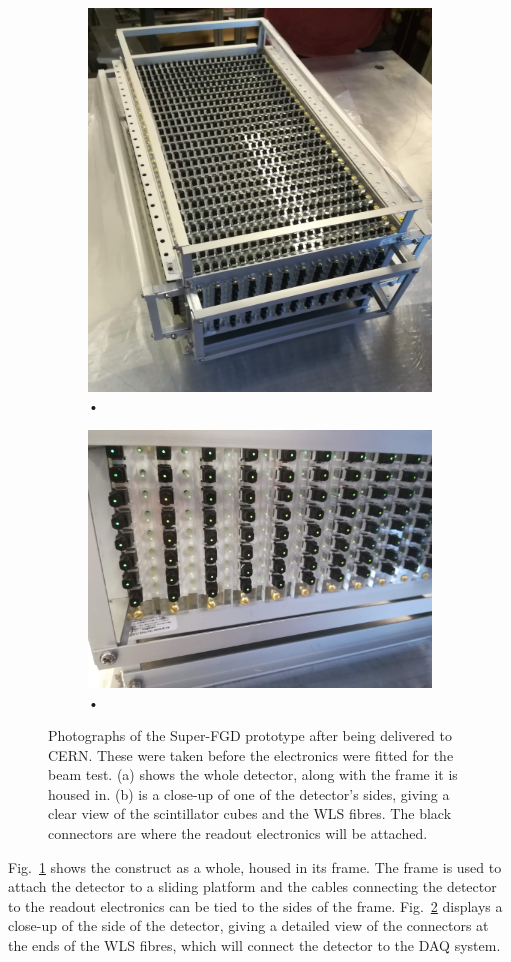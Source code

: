 \documentclass[aps,pra,12pt,notitlepage,tightenlines]{revtex4-1}
\begin{document}
 \begin{figure}
  \centering
  \begin{subfigure}{.5\textwidth}
   \centering
   \includegraphics[width=.7\linewidth]{proto}
   \caption{•}
   \label{fig:protoa}
  \end{subfigure}%
  \begin{subfigure}{.5\textwidth}
   \centering
   \includegraphics[width=.8\linewidth]{side}
   \caption{•}
   \label{fig:protob}
  \end{subfigure}
  \caption{Photographs of the Super-FGD prototype after being delivered to CERN. These were taken before the electronics were fitted for the beam test. (a) shows the whole detector, along with the frame it is housed in. (b) is a close-up of one of the detector's sides, giving a clear view of the scintillator cubes and the WLS fibres. The black connectors are where the readout electronics will be attached.}
  \label{fig:proto}
 \end{figure}
Fig.~\ref{fig:protoa} shows the construct as a whole, housed in its frame. The frame is used to attach the detector to a sliding platform and the cables connecting the detector to the readout electronics can be tied to the sides of the frame. Fig.~\ref{fig:protob} displays a close-up of the side of the detector, giving a detailed view of the connectors at the ends of the WLS fibres, which will connect the detector to the DAQ system.
\end{document}
